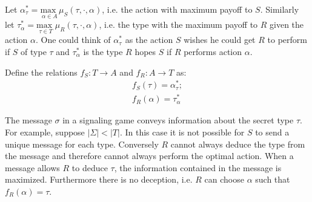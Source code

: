 \documentclass{article}
\begin{document}
\noindent Let $\alpha_\tau^* = \underset{\alpha \in A}{\text{max }} \mu_S(\tau, \cdot, \alpha)$, i.e. the action with maximum payoff to $S$. Similarly let $\tau_\alpha^* = \underset{\tau \in T}{\text{max }} \mu_R(\tau, \cdot, \alpha)$, i.e. the type with the maximum payoff to $R$ given the action $\alpha$. One could think of $\alpha_\tau^*$ as the action $S$ wishes he could get $R$ to perform if $S$ of type $\tau$ and $\tau_\alpha^*$ is the type $R$ hopes $S$ if $R$ performs action $\alpha$.

Define the relations $f_S: T \rightarrow A$ and $f_R: A \rightarrow T$ as:
\begin{align*}
    f_S(\tau) = \alpha_\tau^*;\\
    f_R(\alpha) = \tau_\alpha^*
\end{align*}


The message $\sigma$ in a signaling game conveys information about the secret type $\tau$. For example, suppose $\vert \Sigma \vert < \vert T \vert$. In this case it is not possible for $S$ to send a unique message for each type. Conversely $R$ cannot always deduce the type from the message and therefore cannot always perform the optimal action. When a message allows $R$ to deduce $\tau$, the information contained in the message is maximized. Furthermore there is no deception, i.e. $R$ can choose $\alpha$ such that $f_R(\alpha) = \tau$.
\end{document}
